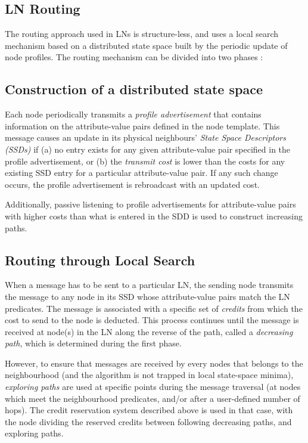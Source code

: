 \subsection{LN Routing}

The routing approach used in LNs is structure-less, and uses a local search
mechanism based on a distributed state space built by the periodic update of
node profiles. The routing mechanism can be divided into two phases \cite{mottola_LNAbstraction}:

\subsection{Construction of a distributed state space}
Each node periodically transmits a \emph{profile advertisement} that contains
information on the attribute-value pairs defined in the node template. This
message causes an update in its physical neighbours' \emph{State Space
Descriptors (SSDs)} if (a) no entry exists for any given attribute-value pair
specified in the profile advertisement, or (b) the \emph{transmit cost} is lower
than the costs for any existing SSD entry for a particular attribute-value pair.
If any such change occurs, the profile advertisement is rebroadcast with an
updated cost.

Additionally, passive listening to profile advertisements for attribute-value
pairs with higher costs than what is entered in the SDD is used to construct
increasing paths.

\subsection{ Routing through Local Search}
When a message has to be sent to a particular LN, the sending node transmits the
message to any node in its SSD whose attribute-value pairs match the LN
predicates. The message is associated with a specific set of \emph{credits} from
which the cost to send to the node is deducted. This process continues until the
message is received at node(s) in the LN along the reverse of the path, called
a \emph{decreasing path}, which is determined during the first phase. 

However, to ensure that messages are received by every nodes that belongs to the
neighbourhood (and the algorithm is not trapped in local state-space minima),
\emph{exploring paths} are used at specific points during the message traversal
(at nodes which meet the neighbourhood predicates, and/or after a user-defined
number of hops). The credit reservation system described above is used in that
case, with the node dividing the reserved credits between following decreasing
paths, and exploring paths.

